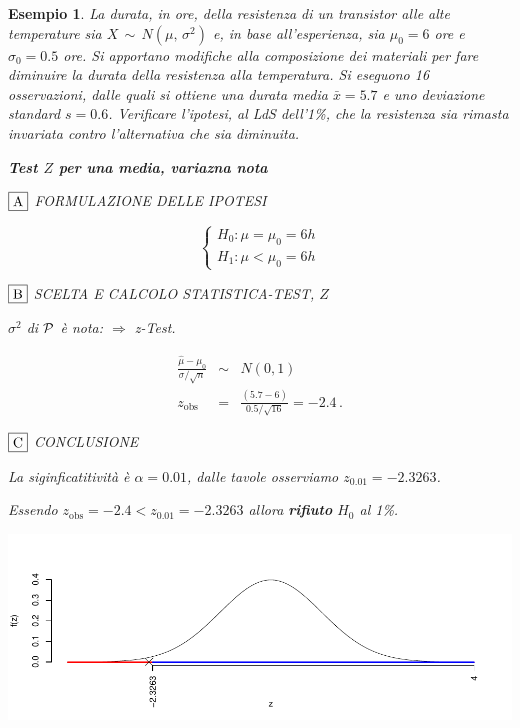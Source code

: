 \documentclass[
  11pt,
]{book}
\theoremstyle{mytheoremstyle}
\theoremstyle{mydefstyle}
\newtheorem{example}{{Esempio}}[section]
\begin{document}
\begin{example}

La durata, in ore, della resistenza di un transistor alle alte
temperature sia \(X \,\sim\, N(\mu,\, \sigma^{2})\) e, in base
all'esperienza, sia \(\mu_{0}=6\) ore e \(\sigma_{0}=0.5\) ore. Si apportano
modifiche alla composizione dei materiali per fare diminuire la durata
della resistenza alla temperatura. Si eseguono 16 osservazioni, dalle
quali si ottiene una durata media \(\bar{x}=5.7\) e uno deviazione
standard \(s=0.6\). Verificare l'ipotesi, al LdS dell'1\%, che la
resistenza sia rimasta invariata contro l'alternativa che sia diminuita.

\textbf{Test \(Z\) per una media, variazna nota}

\(\fbox{A}\) FORMULAZIONE DELLE IPOTESI

\[\begin{cases}
   H_0: \mu = \mu_0=6h \\
   H_1: \mu < \mu_0=6h 
   \end{cases}\]

\(\fbox{B}\) SCELTA E CALCOLO STATISTICA-TEST, \(Z\)

\(\sigma^{2}\) di \(\cal{P}\) è nota: \(\Rightarrow\) z-Test.

\begin{eqnarray*}
   \frac{\hat\mu - \mu_{0}} {\sigma/\sqrt{n}}&\sim&N(0,1)\\
   z_{\text{obs}}
   &=& \frac{ ( 5.7 -  6 )} { 0.5 /\sqrt{ 16 }}
   =   -2.4 \, .
   \end{eqnarray*}

\(\fbox{C}\) CONCLUSIONE

La siginficatitività è \(\alpha=0.01\), dalle tavole osserviamo \(z_{0.01}=-2.3263\).

Essendo \(z_\text{obs}=-2.4<z_{0.01}=-2.3263\) allora \textbf{rifiuto} \(H_0\) al 1\%.

\begin{center}\includegraphics{Appunti_di_Statistica_2025_files/figure-latex/15-test-mu-pi-3,-1} \end{center}

\end{example}
\end{document}
